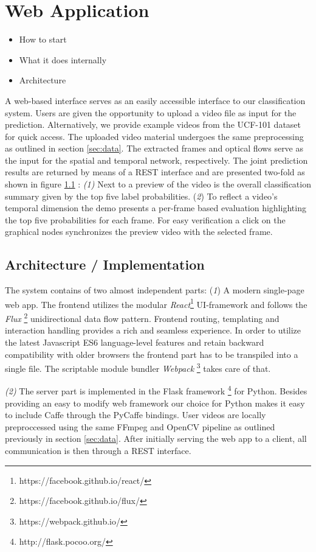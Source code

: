 \section{Web Application}
\label{sec:web}
\begin{itemize}
	\item How to start
	\item What it does internally
	\item Architecture
\end{itemize}

A web-based interface serves as an easily accessible interface to our classification system.
Users are given the opportunity to upload a video file as input for the prediction.
Alternatively, we provide example videos from the UCF-101 dataset for quick access.
The uploaded video material undergoes the same preprocessing as outlined in section \ref{sec:data}.
The extracted frames and optical flows serve as the input for the spatial and temporal network, respectively.
The joint prediction results are returned by means of a REST interface and are presented two-fold as shown in figure \ref{} :
\textit{(1)} Next to a preview of the video is the overall classification summary given by the top five label probabilities.
(\textit{2}) To reflect a video’s temporal dimension the demo presents a per-frame based evaluation highlighting the top five probabilities for each frame.
For easy verification a click on the graphical nodes synchronizes the preview video with the selected frame.

\subsection{Architecture / Implementation}
The system contains of two almost independent parts:
(\textit{1}) A modern single-page web app.
The frontend utilizes the modular \textit{React}\footnote{https://facebook.github.io/react/} UI-framework and follows the \textit{Flux} \footnote{https://facebook.github.io/flux/} unidirectional data flow pattern.
Frontend routing, templating and interaction handling provides a rich and seamless experience.
In order to utilize the latest Javascript ES6 language-level features and retain backward compatibility with older browsers the frontend part has to be transpiled into a single file.
The scriptable module bundler \textit{Webpack} \footnote{https://webpack.github.io/} takes care of that.

\textit{(2)} The server part is implemented in the Flask framework \footnote{http://flask.pocoo.org/} for Python.
Besides providing an easy to modify web framework our choice for Python makes it easy to include Caffe through the PyCaffe bindings.
User videos are locally preproccessed using the same FFmpeg and OpenCV pipeline as outlined previously in section \ref{sec:data}.
After initially serving the web app to a client, all communication is then through a REST interface.

